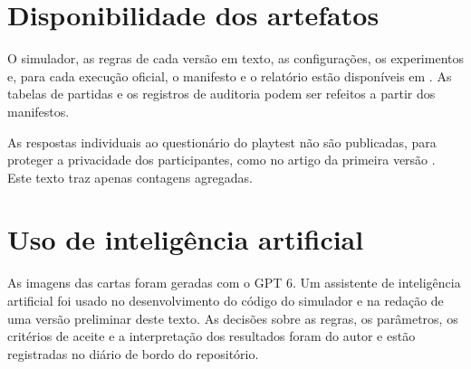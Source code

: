 \section*{Disponibilidade dos artefatos}

O simulador, as regras de cada versão em texto, as configurações, os experimentos e, para cada execução
oficial, o manifesto e o relatório estão disponíveis em . As tabelas de
partidas e os registros de auditoria podem ser refeitos a partir dos manifestos.

As respostas individuais ao questionário do playtest não são publicadas, para proteger a privacidade dos
participantes, como no artigo da primeira versão \cite{oliveira2025critical}. Este texto traz apenas contagens
agregadas.

\section*{Uso de inteligência artificial}

As imagens das cartas foram geradas com o GPT 6. Um assistente de inteligência artificial foi usado no
desenvolvimento do código do simulador e na redação de uma versão preliminar deste texto. As decisões sobre as
regras, os parâmetros, os critérios de aceite e a interpretação dos resultados foram do autor e estão registradas
no diário de bordo do repositório.

